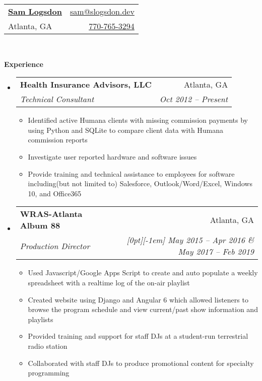 \documentclass[letterpaper,11pt]{article}
\makeatletter
\newcommand{\resitem}[1]{\item #1 \vspace{-2pt}}
\newcommand{\resheading}[1]{{\large \colorbox{mygrey}{\begin{minipage}{\textwidth}{\textbf{#1 \vphantom{p\^{E}}}}\end{minipage}}}}
\newcommand{\ressubheading}[4]{
\begin{tabular*}{6.5in}{l@{\extracolsep{\fill}}r}
    \textbf{#1} & #2 \\
    \textit{#3} & \textit{#4} \\
\end{tabular*}\vspace{-6pt}}
\makeatother
\begin{document}
    \newcommand{\mywebheader}{
    \begin{tabular*}{7in}{l@{\extracolsep{\fill}}r}
        \href{https://slogsdon.dev}{\textbf{\LARGE Sam Logsdon}} & \href{mailto:sam@slogsdon.dev}{sam@slogsdon.dev}\\
        {Atlanta, GA}

        &
        \href{tel:+17707653294}{770-765-3294}
    \end{tabular*}
    \\
    \vspace{0.1in}
    }

    \mywebheader

    


    \resheading{Experience}
    \begin{itemize}[leftmargin=*]
        \item[]
        \ressubheading{Health Insurance Advisors, LLC}{Atlanta, GA}
        {Technical Consultant}{Oct 2012 -- Present}
        { \footnotesize
        \begin{itemize}
            \resitem{Identified active Humana clients with missing commission payments by using Python and SQLite to compare client data with Humana commission reports}
            \resitem{Investigate user reported hardware and software issues}
            \resitem{Provide training and technical assistance to employees for software including(but not limited to) Salesforce, Outlook/Word/Excel, Windows 10, and Office365}
        \end{itemize}
        }
        \item[]
        \ressubheading{WRAS-Atlanta Album 88}%
        {Atlanta, GA}
        {Production Director} {\small  \raisebox{0em}[0pt][-1em]{
        May 2015 -- Apr 2016 \& May 2017 -- Feb 2019}
        }

        {\footnotesize

        \begin{itemize}
            \resitem {Used Javascript/Google Apps Script to create and auto populate a weekly spreadsheet with a realtime log of the on-air playlist}
            \resitem {Created website using Django and Angular 6 which allowed listeners to browse the program schedule and view current/past show information and playlists}
            \resitem {Provided training and support for staff DJs at a student-run terrestrial radio station}
            \resitem {Collaborated with staff DJs to produce promotional content for specialty programming}
        \end{itemize}
        }
    \end{itemize}
\end{document}
